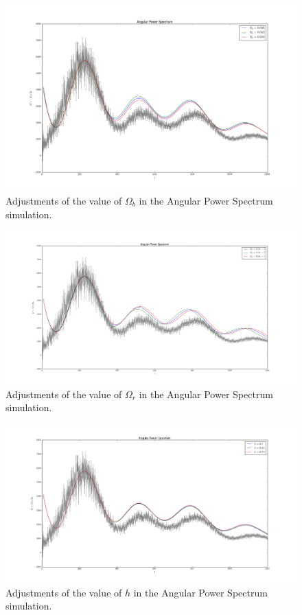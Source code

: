 \documentclass[a4paper]{article}
\begin{document}
\begin{figure}[ht]\label{fig:omegb}
\centering
\includegraphics[width=\linewidth]{C_l_omega_b}
\caption{Adjustments of the value of $\Omega_b$ in the Angular Power Spectrum simulation.}
\end{figure}

\begin{figure}[ht]\label{fig:omegr}
\centering
\includegraphics[width=\linewidth]{C_l_omega_r}
\caption{Adjustments of the value of $\Omega_r$ in the Angular Power Spectrum simulation.}
\end{figure}

\begin{figure}[ht]\label{fig:h}
\centering
\includegraphics[width=\linewidth]{C_l_h}
\caption{Adjustments of the value of $h$ in the Angular Power Spectrum simulation.}
\end{figure}
\end{document}
